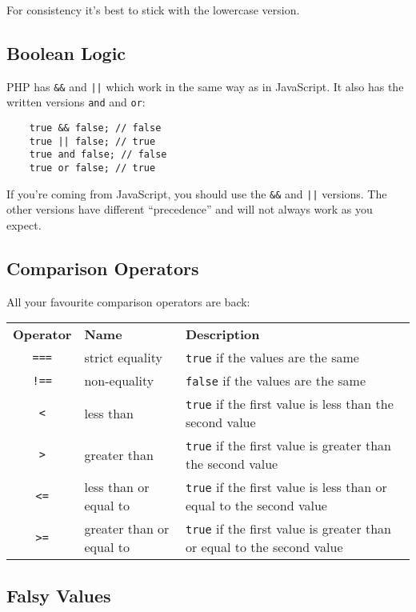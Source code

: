 For consistency it's best to stick with the lowercase version.

\subsection{Boolean Logic}

PHP has \texttt{\&\&} and \texttt{||} which work in the same way as in JavaScript. It also has the written versions \texttt{and} and \texttt{or}:

\begin{verbatim}
    true && false; // false
    true || false; // true
    true and false; // false
    true or false; // true
\end{verbatim}

If you're coming from JavaScript, you should use the \texttt{\&\&} and \texttt{||} versions. The other versions have different ``precedence'' and will not always work as you expect.

\subsection{Comparison Operators}

All your favourite comparison operators are back:
\\

\begin{small}
    \begin{tabu}{c l X}
        \textbf{Operator} & \textbf{Name} & \textbf{Description} \\
        \texttt{===} & strict equality & \texttt{true} if the values are the same \\
        \texttt{!==} & non-equality & \texttt{false} if the values are the same\\
        \texttt{<} & less than & \texttt{true} if the first value is less than the second value  \\
        \texttt{>} & greater than & \texttt{true} if the first value is greater than the second value\\
        \texttt{<=} & less than or equal to & \texttt{true} if the first value is less than or equal to the second value  \\
        \texttt{>=} & greater than or equal to & \texttt{true} if the first value is greater than or equal to the second value
    \end{tabu}
\end{small}


\subsection{Falsy Values}

